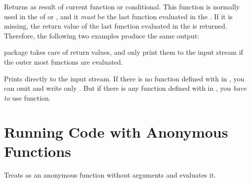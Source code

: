 \documentclass[oneside]{book}
\begin{document}
\begin{function}{\prgReturn}
\begin{syntax}
 
\end{syntax}
Returns  as result of current function or conditional.
This function is normally used in the  of 
or , and it \emph{must} be the last function evaluated in the .
If it is missing, the return value of the last function evaluated in the 
is returned. Therefore, the following two examples produce the same output:
\begin{codehigh}
\IgnoreSpacesOn
\prgNewFunction {} {
  \intSet {}
  \prgReturn {\expValue \lTmpaInt}
}
\IgnoreSpacesOff
{}
\end{codehigh}
\begin{codehigh}
\IgnoreSpacesOn
\prgNewFunction {} {
  \intSet {}
  \expValue \lTmpaInt
}
\IgnoreSpacesOff
{}
\end{codehigh}
 package takes care of return values,
and only print them to the input stream if the outer most functions are evaluated.
\end{function}

\begin{function}{\prgPrint}
\begin{syntax}
 
\end{syntax}
Prints  directly to the input stream.
If there is no function defined with  in ,
you can omit  and write only .
But if there is any function defined with  in ,
you \emph{have to} use  function.
\end{function}

\section{Running Code with Anonymous Functions}

\begin{function}{\prgDo}
\begin{syntax}
 
\end{syntax}
Treats  as an anonymous function without arguments and evaluates it.
\end{function}
\end{document}
